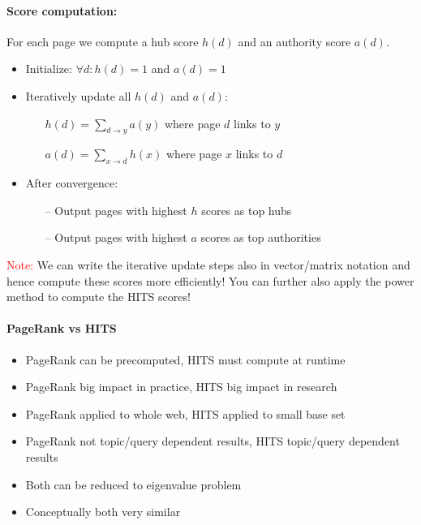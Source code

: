 \documentclass[a4paper,11pt]{article}
\begin{document}
\begin{multicols}{2}
\paragraph{Score computation:}
For each page we compute a hub score $h(d)$ and an authority score $a(d)$.
\begin{itemize}
  \item Initialize: $\forall d: h(d) = 1$ and $a(d) = 1$
  \item Iteratively update all $h(d)$ and $a(d)$:\\
  \begin{itemize}
    \item[] $h(d) = \sum\limits_{d \rightarrow y} a(y)$ \hspace{0.7cm}where page $d$ links to $y$
    \item[] $a(d) = \sum\limits_{x \rightarrow d} h(x)$ \hspace{0.7cm}where page $x$ links to $d$
  \end{itemize}
  \item After convergence:\\
  \begin{itemize}
    \item[--] Output pages with highest $h$ scores as top hubs
    \item[--] Output pages with highest $a$ scores as top authorities
  \end{itemize}
\end{itemize}
\textcolor{red}{Note:} We can write the iterative update steps also in vector/matrix notation and hence compute these scores more efficiently! You can further also apply the power method to compute the HITS scores!
\paragraph{PageRank vs HITS}
\begin{itemize}
  \item PageRank can be precomputed, HITS must compute at runtime
  \item PageRank big impact in practice, HITS big impact in research
  \item PageRank applied to whole web, HITS applied to small base set
  \item PageRank not topic/query dependent results, HITS topic/query dependent results
  \item Both can be reduced to eigenvalue problem
  \item Conceptually both very similar
\end{itemize}
\vfill
\end{multicols}%
\end{document}
